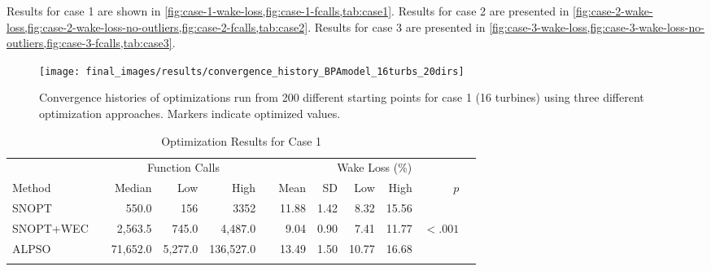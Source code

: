 \documentclass[a4paper]{jpconf}
\begin{document}
Results for case 1 are shown in \cref{fig:case-1-wake-loss,fig:case-1-fcalls,tab:case1}. Results for case 2 are presented in \cref{fig:case-2-wake-loss,fig:case-2-wake-loss-no-outliers,fig:case-2-fcalls,tab:case2}.  Results for case 3 are presented in \cref{fig:case-3-wake-loss,fig:case-3-wake-loss-no-outliers,fig:case-3-fcalls,tab:case3}. 
%
%
\begin{figure}[h]
\centering
\begin{minipage}[t]{.75\textwidth}
\centering
\texttt{[image: final\_images/results/convergence\_history\_BPAmodel\_16turbs\_20dirs]}  
\caption{Convergence histories of optimizations run from 200 different starting points for case 1 (16 turbines) using three different optimization approaches. Markers indicate optimized values.}
\label{fig:case-1-histories}
\end{minipage} 
\end{figure}
%
\begin{table}
\caption{Optimization Results for Case 1}
\label{tab:case1}
\centering
\begin{tabular}{lcrrrcrrrrrr}
	\br
	& & \multicolumn{3}{c}{Function Calls} &  & \multicolumn{6}{c}{\quad \quad \quad \quad \quad Wake Loss (\%) \quad \quad \quad \quad \quad} \\
	\cline{3-5}\cline{7-12}
	Method  & & Median & Low & High & & Mean & SD & Low & High & $p$ \\
	\cline{1-1}\cline{3-5}\cline{7-12}
	SNOPT  & & 550.0 & 156 & 3352 & & 11.88 & 1.42 & 8.32 & 15.56 &   \\
	SNOPT+WEC & & 2,563.5 & 745.0 & 4,487.0 &  &  9.04 & 0.90 & 7.41 & 11.77 & $<.001$\\
	ALPSO & & 71,652.0 & 5,277.0 & 136,527.0 & & 13.49 & 1.50 & 10.77 & 16.68 & \\
	\br
\end{tabular}
\end{table}
\end{document}
